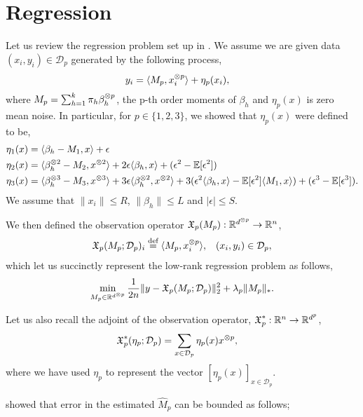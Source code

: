 \documentclass[tablecaption=bottom]{jmlr}
\newcommand\eqdef{\ensuremath{\stackrel{\textrm{def}}{=}}} %
\newcommand\sD{\ensuremath{\mathcal{D}}}
\begin{document}
\section{Regression}

Let us review the regression problem set up in \cite[Section
3]{ChagantyLiang2013}. We assume we are given data $(x_i,y_i) \in \sD_p$
generated by the following process,
\begin{align}
  y_i &= \langle M_p, x_i^{\otimes p} \rangle + \eta_p(x_i),
\end{align}
where $M_p = \sum_{h=1}^k \pi_h \beta_h^{\otimes p}$, the p-th order moments
of $\beta_h$ and $\eta_p(x)$ is zero mean noise. In particular, for $p \in \{1,2,3\}$,
we showed that $\eta_p(x)$ were defined to be,
\begin{align}
  \eta_1(x) &= \langle \beta_h - M_1, x \rangle + \epsilon \label{eqn:eta1} \\
  \eta_2(x) &= \langle \beta_h^{\otimes 2} - M_2, x^{\otimes 2} \rangle + 2 \epsilon \langle \beta_h, x \rangle + (\epsilon^2 - \operatorname{\mathbb{E}}[\epsilon^2]) \label{eqn:eta2}\\
  \eta_3(x) &= \langle \beta_h^{\otimes 3} - M_3, x^{\otimes 3} \rangle
        + 3 \epsilon \langle \beta_h^{\otimes 2}, x^{\otimes 2} \rangle 
        + 3(\epsilon^2 \langle \beta_h, x \rangle - \operatorname{\mathbb{E}}[\epsilon^2] \langle M_1, x \rangle)
        + (\epsilon^3 - \operatorname{\mathbb{E}}[\epsilon^3]). \label{eqn:eta3}
\end{align}
We assume that $\|x_i\| \le R$, $\| \beta_h \| \le L$ and $|\epsilon| \le S$.

We then defined the observation operator $\operatorname{\mathfrak{X}}_p(M_p) : \mathbb{R}^{d^{\otimes p}} \to \mathbb{R}^{n}$,
\begin{align}
\opX_p(M_p; \sD_p)_i &\eqdef \innerp{M_p}{x\tp{p}_i}, & (x_i, y_i) \in \sD_p,
\end{align}
which let us succinctly represent the low-rank regression problem as follows,
\begin{align}
  \min_{M_p \in \Re^{d\tp{p}}} \frac{1}{2n} \| y - \opX_p(M_p; \sD_p) \|^2_2 + \lambda_p \|M_p\|_*.
\end{align}

Let us also recall the adjoint of the observation operator, $\operatorname{\mathfrak{X}}_p^* : \mathbb{R}^{n} \to \mathbb{R}^{d^p}$,
\begin{align}
  \opX_p^*(\eta_p; \sD_p) &= \sum_{x \in \sD_p} \eta_p(x) x\tp{p},
\end{align}
where we have used $\eta_p$ to represent the vector $\left[\eta_p(x)\right]_{x \in \sD_p}$. 

\citet{Tomioka2011} showed that error in the estimated $\hat M_p$ can be
bounded as follows;
\end{document}
